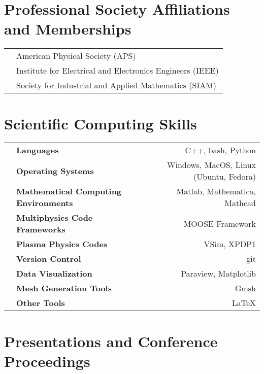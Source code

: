 \documentclass{article}
\begin{document}
\section*{Professional Society Affiliations and Memberships}

\begin{tabularx}{\textwidth}{l l}
	\hspace{2em} & American Physical Society (APS) \\
				 & Institute for Electrical and Electronics Engineers (IEEE) \\
				 & Society for Industrial and Applied Mathematics (SIAM)
\end{tabularx}

\section*{Scientific Computing Skills}

	\begin{tabularx}{\textwidth}{l X r}
		\hspace {2em} & \textbf{Languages} & C++, bash, Python \\
					  & \textbf{Operating Systems} & Windows, MacOS, Linux (Ubuntu, Fedora) \\
					  & \textbf{Mathematical Computing Environments} & Matlab, Mathematica, Mathcad \\
					  & \textbf{Multiphysics Code Frameworks} & MOOSE Framework \\
					  & \textbf{Plasma Physics Codes} & VSim, XPDP1 \\
					  & \textbf{Version Control} & git \\
					  & \textbf{Data Visualization} & Paraview, Matplotlib \\
					  & \textbf{Mesh Generation Tools} & Gmsh \\
					  & \textbf{Other Tools} & \LaTeX
	\end{tabularx}

\section*{Presentations and Conference Proceedings}
\end{document}

